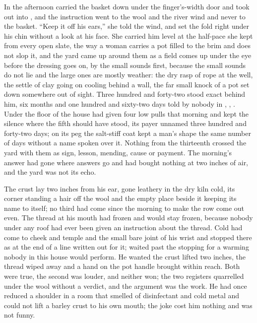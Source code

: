 In the afternoon  carried the basket down under the finger's-width door and took  out into , and the instruction went to the wool and the river wind and never to the basket. “Keep it off his ears,” she told the wind, and set the fold right under his chin without a look at his face. She carried him level at the half-pace she kept from every open slate, the way a woman carries a pot filled to the brim and does not slop it, and the yard came up around them as a field comes up under the eye before the dressing goes on, by the small sounds first, because the small sounds do not lie and the large ones are mostly weather: the dry rasp of rope at the well, the settle of clay going on cooling behind a wall, the far small knock of a pot set down somewhere out of sight. Three hundred and forty-two stood exact behind him, six months and one hundred and sixty-two days told by nobody in , , . Under the floor of the house  had given four low pulls that morning and kept the silence where the fifth should have stood, its payer unnamed three hundred and forty-two days; on its peg the salt-stiff coat kept a man's shape the same number of days without a name spoken over it. Nothing from the thirteenth crossed the yard with them as sign, lesson, mending, cause or payment. The morning's answer had gone where answers go and had bought nothing at two inches of air, and the yard was not its echo.

The crust lay two inches from his ear, gone leathery in the dry kiln cold, its corner standing a hair off the wool and the empty place beside it keeping its name to itself; no third had come since the morning to make the row come out even. The thread at his mouth had frozen and would stay frozen, because nobody under any roof had ever been given an instruction about the thread. Cold had come to cheek and temple and the small bare joint of his wrist and stopped there as at the end of a line written out for it;  waited past the stopping for a warming nobody in this house would perform. He wanted the crust lifted two inches, the thread wiped away and a hand on the pot handle brought within reach. Both were true, the second was louder, and neither won; the two registers quarrelled under the wool without a verdict, and the argument was the work. He had once reduced a shoulder in a room that smelled of disinfectant and cold metal and could not lift a barley crust to his own mouth; the joke cost him nothing and was not funny.

